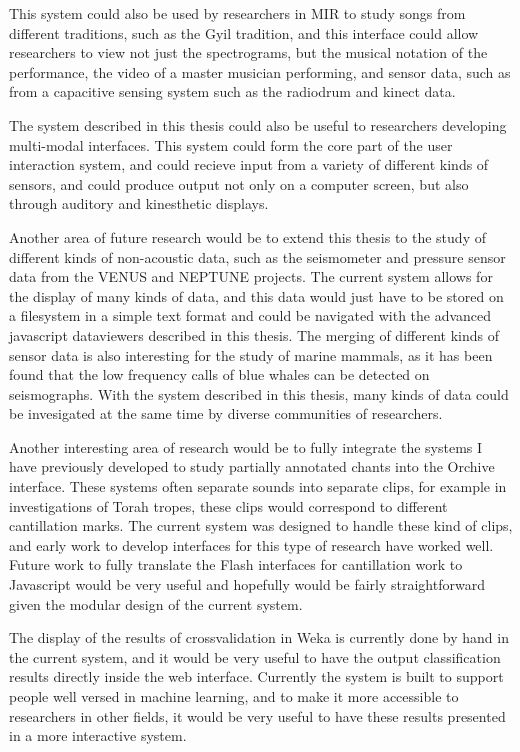 \documentclass[12pt,oneside]{book}
\begin{document}
This system could also be used by researchers in MIR to study songs
from different traditions, such as the Gyil tradition, and this
interface could allow researchers to view not just the spectrograms,
but the musical notation of the performance, the video of a master
musician performing, and sensor data, such as from a capacitive
sensing system such as the radiodrum and kinect data.

The system described in this thesis could also be useful to
researchers developing multi-modal interfaces.  This system could form
the core part of the user interaction system, and could recieve input
from a variety of different kinds of sensors, and could produce output
not only on a computer screen, but also through auditory and
kinesthetic displays.

Another area of future research would be to extend this thesis to the
study of different kinds of non-acoustic data, such as the seismometer
and pressure sensor data from the VENUS and NEPTUNE projects.  The
current system allows for the display of many kinds of data, and this
data would just have to be stored on a filesystem in a simple text
format and could be navigated with the advanced javascript dataviewers
described in this thesis.  The merging of different kinds of sensor
data is also interesting for the study of marine mammals, as it has
been found that the low frequency calls of blue whales can be detected
on seismographs.  With the system described in this thesis, many kinds
of data could be invesigated at the same time by diverse communities
of researchers.

Another interesting area of research would be to fully integrate the
systems I have previously developed to study partially annotated
chants into the Orchive interface.  These systems often separate
sounds into separate clips, for example in investigations of Torah
tropes, these clips would correspond to different cantillation marks.
The current system was designed to handle these kind of clips, and
early work to develop interfaces for this type of research have worked
well.  Future work to fully translate the Flash interfaces for
cantillation work to Javascript would be very useful and hopefully
would be fairly straightforward given the modular design of the
current system.

The display of the results of crossvalidation in Weka is currently
done by hand in the current system, and it would be very useful to
have the output classification results directly inside the web
interface.  Currently the system is built to support people well
versed in machine learning, and to make it more accessible to
researchers in other fields, it would be very useful to have these
results presented in a more interactive system.
\end{document}
